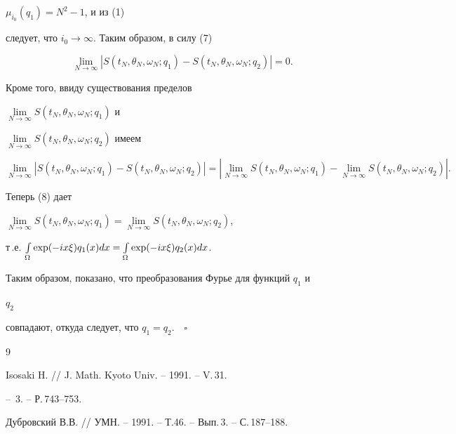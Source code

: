 $\mu_{i_0}(q_1)=N^2-1$, и из (1) 


следует, что $i_0\to\infty$. Таким образом, в силу (7) 


\begin{equation} 


\lim_{N\to\infty}|S(t_N,\theta_N,\omega_N;q_1)- 


S(t_N,\theta_N,\omega_N;q_2)|=0. 


\end{equation} 


Кроме того, ввиду существования пределов 


$\lim\limits_{N\to\infty}S(t_N,\theta_N,\omega_N;q_1)$ и 


$\lim\limits_{N\to\infty}S(t_N,\theta_N,\omega_N;q_2)$ имеем 


$$ 


\lim_{N\to\infty}|S(t_N,\theta_N,\omega_N;q_1)- 


S(t_N,\theta_N,\omega_N;q_2)|= 


|\lim_{N\to\infty}S(t_N,\theta_N,\omega_N;q_1)- 


\lim_{N\to\infty}S(t_N,\theta_N,\omega_N;q_2)|. 


$$ 


Теперь (8) дает 


$\lim\limits_{N\to\infty}S(t_N,\theta_N,\omega_N;q_1)= 


\lim\limits_{N\to\infty}S(t_N,\theta_N,\omega_N;q_2)$, 


т\,.е. $\int\limits_\Omega\exp(-i x\xi)q_1(x)dx= \linebreak


\int\limits_\Omega\exp(-i x\xi)q_2(x)dx$. 


 


Таким образом, показано, что преобразования Фурье для функций $q_1$ и 


$q_2$ 


совпадают, откуда следует, что $q_1=q_2.\quad\square$ 


 


\begin{thebibliography}{9} 


 




Isosaki H. // J. Math. Kyoto Univ. -- 1991. -- V.\,31. 


-- \No\,3. -- Р.\,743--753. 




Дубровский В.В. // УМН. -- 1991. -- Т.46. -- Вып.\,3. -- С.\,187--188. 


 


\end{thebibliography} 


 


\vskip 2cm 


 






 


\label{end} 


 


